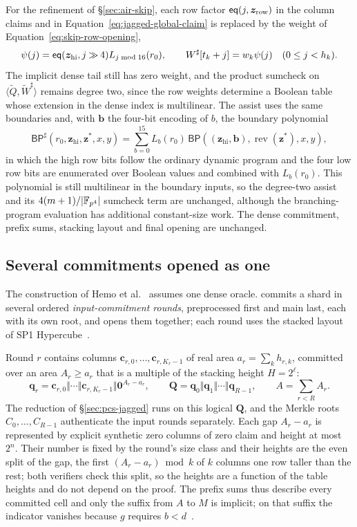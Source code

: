 For the refinement of \S\ref{sec:air-skip}, each row factor $\mathsf{eq}(j,\bm z_{\mathrm{row}})$ in the column claims and in Equation~\eqref{eq:jagged-global-claim} is replaced by the weight of Equation~\eqref{eq:skip-row-opening},
\[
  \psi(j)=\mathsf{eq}(\bm z_{\mathrm{hi}},j\mathbin{\gg}4)
           L_{j\bmod16}(r_0),\qquad
  W^\sharp[t_k+j]=w_k\psi(j)\quad(0\le j<h_k).
\]
The implicit dense tail still has zero weight, and the product sumcheck on $\langle\widetilde Q,\widetilde W^\sharp\rangle$ remains degree two, since the row weights determine a Boolean table whose extension in the dense index is multilinear. The assist uses the same boundaries and, with $\bm b$ the four-bit encoding of $b$, the boundary polynomial
\[
  \mathsf{BP}^\sharp(r_0,\bm z_{\mathrm{hi}},\bm z^*,x,y)
    =\sum_{b=0}^{15}L_b(r_0)\,
       \mathsf{BP}((\bm z_{\mathrm{hi}},\bm b),
                  \operatorname{rev}(\bm z^*),x,y),
\]
in which the high row bits follow the ordinary dynamic program and the four low row bits are enumerated over Boolean values and combined with $L_b(r_0)$. This polynomial is still multilinear in the boundary inputs, so the degree-two assist and its $4(m+1)/|\mathbb{F}_{p^4}|$ sumcheck term are unchanged, although the branching-program evaluation has additional constant-size work. The dense commitment, prefix sums, stacking layout and final \WHIR{} opening are unchanged.

\subsection{Several commitments opened as one}
\label{sec:pcs-stacking}

The construction of Hemo et al.~\citep{jagged-pcs} assumes one dense oracle. \Ziren{} commits a shard in several ordered \emph{input-commitment rounds}, preprocessed first and main last, each with its own root, and opens them together; each round uses the stacked layout of SP1 Hypercube~\citep{sp1-hypercube}.

Round $r$ contains columns $\mathbf c_{r,0},\ldots,\mathbf c_{r,K_r-1}$ of real area $a_r = \sum_k h_{r,k}$, committed over an area $A_r \ge a_r$ that is a multiple of the stacking height $H=2^\ell$:
\[
  \mathbf q_r = \mathbf c_{r,0}\Vert\cdots\Vert\mathbf c_{r,K_r-1}
                 \Vert \mathbf 0^{A_r-a_r},
  \qquad
  \mathbf Q = \mathbf q_0\Vert\mathbf q_1\Vert\cdots\Vert\mathbf q_{R-1},
  \qquad A=\sum_{r<R}A_r.
\]
The reduction of \S\ref{sec:pcs-jagged} runs on this logical $\mathbf Q$, and the Merkle roots $C_0,\ldots,C_{R-1}$ authenticate the input rounds separately. Each gap $A_r-a_r$ is represented by explicit synthetic zero columns of zero claim and height at most $2^n$. Their number is fixed by the round's size class and their heights are the even split of the gap, the first $(A_r - a_r) \bmod k$ of $k$ columns one row taller than the rest; both verifiers check this split, so the heights are a function of the table heights and do not depend on the proof. The prefix sums thus describe every committed cell and only the suffix from $A$ to $M$ is implicit; on that suffix the indicator vanishes because $g$ requires $b<d$~\citep[fn.~4]{jagged-pcs}.

